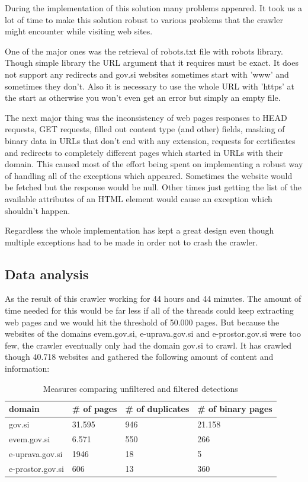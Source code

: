 \documentclass[9pt]{IEEEtran}
\begin{document}
During the implementation of this solution many problems appeared.
It took us a lot of time to make this solution robust to various problems that the crawler might encounter while visiting web sites.

One of the major ones was the retrieval of robots.txt file with robots library. 
Though simple library the URL argument that it requires must be exact.
It does not support any redirects and gov.si websites sometimes start with 'www' and sometimes they don't. 
Also it is necessary to use the whole URL with 'https' at the start as otherwise you won't even get an error but simply an empty file.

The next major thing was the inconsistency of web pages responses to HEAD requests, GET requests, filled out content type (and other) fields, masking of binary data in URLs that don't end with any extension, requests for certificates and redirects to completely different pages which started in URLs with their domain.
This caused most of the effort being spent on implementing a robust way of handling all of the exceptions which appeared. 
Sometimes the website would be fetched but the response would be null.
Other times just getting the list of the available attributes of an HTML element would cause an exception which shouldn't happen.

Regardless the whole implementation has kept a great design even though multiple exceptions had to be made in order not to crash the crawler.

\subsection{Data analysis}

As the result of this crawler working for 44 hours and 44 minutes. 
The amount of time needed for this would be far less if all of the threads could keep extracting web pages and we would hit the threshold of 50.000 pages.
But because the websites of the domains evem.gov.si, e-uprava.gov.si and e-prostor.gov.si were too few, the crawler eventually only had the domain gov.si to crawl.
It has crawled though 40.718 websites and gathered the following amount of content and information:

\begin{table}[ht]{}
\begin{tabu} to 1.0\columnwidth { | X[l] | X[l] | X[l] | X[l] | }
\hline
domain & \# of pages & \# of duplicates & \# of binary pages  \\
\hline
gov.si & 31.595 & 946 & 21.158\\
\hline
evem.gov.si & 6.571 & 550 & 266 \\
\hline
e-uprava.gov.si& 1946 & 18 &  5 \\
\hline
e-prostor.gov.si& 606 & 13 & 360 \\
\hline
\end{tabu}
\caption{Measures comparing unfiltered and filtered detections}
\label{tab2}
\end{table}
\end{document}
